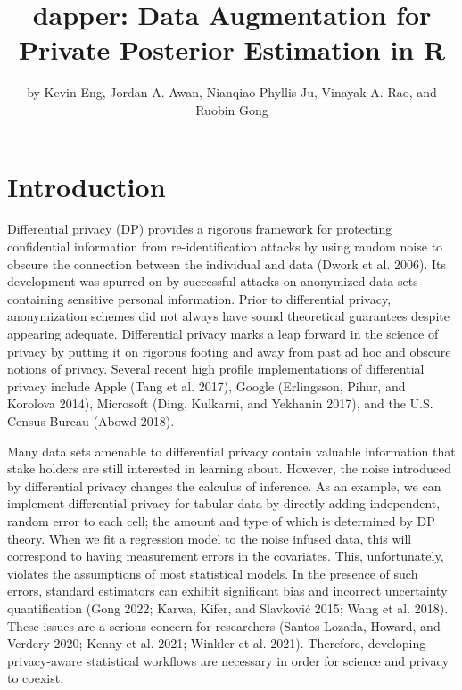 \title{dapper: Data Augmentation for Private Posterior Estimation in R}


\author{by Kevin Eng, Jordan A. Awan, Nianqiao Phyllis Ju, Vinayak A. Rao, and Ruobin Gong}

\maketitle


\hypertarget{introduction}{%
\section{Introduction}\label{introduction}}

Differential privacy (DP) provides a rigorous framework for protecting
confidential information from re-identification attacks by using random
noise to obscure the connection between the individual and data (Dwork et al. 2006).
Its development was spurred on by successful attacks
on anonymized data sets containing sensitive personal information. Prior
to differential privacy, anonymization schemes did not always have sound
theoretical guarantees despite appearing adequate.
Differential privacy marks a leap forward in the science of privacy by putting
it on rigorous footing and away from past ad hoc and obscure notions of privacy.
Several recent high profile
implementations of differential privacy include Apple (Tang et al. 2017), Google (Erlingsson, Pihur, and Korolova 2014), Microsoft (Ding, Kulkarni, and Yekhanin 2017), and the
U.S. Census Bureau (Abowd 2018).

Many data sets amenable to differential privacy contain
valuable information that stake holders are still interested in
learning about. However, the noise introduced by differential privacy
changes the calculus of inference. As an example,
we can implement differential privacy for tabular data by directly
adding independent, random error to each cell; the amount and type of which is determined by DP theory. When we fit a regression model to the noise infused data,
this will correspond to having measurement errors
in the covariates. This, unfortunately, violates the assumptions of most statistical models.
In the presence of such errors, standard estimators can exhibit significant bias and incorrect uncertainty quantification
(Gong 2022; Karwa, Kifer, and Slavković 2015; Wang et al. 2018).
These issues are a serious concern for researchers (Santos-Lozada, Howard, and Verdery 2020; Kenny et al. 2021; Winkler et al. 2021).
Therefore, developing privacy-aware statistical workflows are necessary in order
for science and privacy to coexist.


